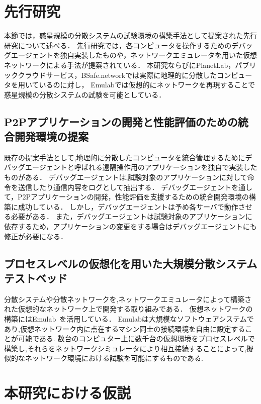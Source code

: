 \section{先行研究}
\label{issue:previous-research}

本節では，惑星規模の分散システムの試験環境の構築手法として提案された先行研究について述べる．
先行研究では，各コンピュータを操作するためのデバッグエージェントを独自実装したものや，ネットワークエミュレータを用いた仮想ネットワークによる手法が提案されている．
本研究ならびにPlanetLab，パブリッククラウドサービス，BSafe.networkでは実際に地理的に分散したコンピュータを用いているのに対し，
Emulabでは仮想的にネットワークを再現することで惑星規模の分散システムの試験を可能としている．

\subsection{P2Pアプリケーションの開発と性能評価のための統合開発環境の提案}

既存の提案手法として,地理的に分散したコンピュータを統合管理するためにデバッグエージェントと呼ばれる遠隔操作用のアプリケーションを独自で実装したものがある．
デバッグエージェントは,試験対象のアプリケーションに対して命令を送信したり通信内容をログとして抽出する．
デバッグエージェントを通して，P2Pアプリケーションの開発，性能評価を支援するための統合開発環境の構築に成功している．
しかし，デバッグエージェントは予め各サーバで動作させる必要がある．
また，デバッグエージェントは試験対象のアプリケーションに依存するため，アプリケーションの変更をする場合はデバッグエージェントにも修正が必要になる．

\subsection{プロセスレベルの仮想化を用いた大規模分散システムテストベッド}
\label{consideration:related-works:emulab}

分散システムや分散ネットワークを,ネットワークエミュレータによって構築された仮想的なネットワーク上で開発する取り組みである．
仮想ネットワークの構築にはEmulab~\cite{Emulab}を活用している．
Emulabは大規模なソフトウェアシステムであり,仮想ネットワーク内に点在するマシン同士の接続環境を自由に設定することが可能である.
数台のコンピュター上に数千台の仮想環境をプロセスレベルで構築し,それらをネットワークシミュレータにより相互接続することによって,擬似的なネットワーク環境における試験を可能にするものである.

\section{本研究における仮説}
\label{issue:hypothesis}

